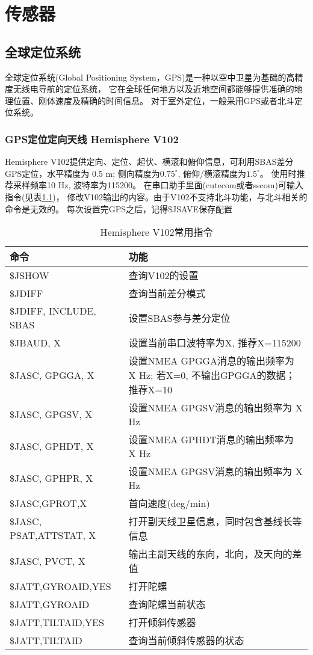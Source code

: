 \chapter{传感器}
\label{chap:sensor}
\section{全球定位系统}
全球定位系统(Global Positioning System，GPS)是一种以空中卫星为基础的高精度无线电导航的定位系统，
它在全球任何地方以及近地空间都能够提供准确的地理位置、刚体速度及精确的时间信息。
对于室外定位，一般采用GPS或者北斗定位系统。


\subsection{GPS定位定向天线 Hemisphere V102}
Hemisphere V102提供定向、定位、起伏、横滚和俯仰信息，可利用SBAS差分GPS定位，水平精度为
0.5 m; 侧向精度为$0.75^{\circ}$, 俯仰/横滚精度为$1.5^{\circ}$。
使用时推荐采样频率10 Hz, 波特率为115200。
在串口助手里面(cutecom或者sscom)可输入指令(见表\ref{tab:V102command})，
修改V102输出的内容。由于V102不支持北斗功能，与北斗相关的命令是无效的。
每次设置完GPS之后，记得\$JSAVE保存配置


\begin{table}[htbp]
  \centering
  \caption{Hemisphere V102常用指令}
    \begin{tabular}{p{11.54em}p{19.96em}}
    \toprule
    命令    & 功能 \\
    \midrule
    \$JSHOW & 查询V102的设置 \\
    \$JDIFF & 查询当前差分模式 \\
    \$JDIFF, INCLUDE, SBAS & 设置SBAS参与差分定位 \\
    \$JBAUD, X & 设置当前串口波特率为X, 推荐X=115200 \\
    \$JASC, GPGGA, X & 设置NMEA GPGGA消息的输出频率为 X Hz; 若X=0, 不输出GPGGA的数据；推荐X=10 \\
    \$JASC, GPGSV, X & 设置NMEA GPGSV消息的输出频率为 X Hz \\
    \$JASC, GPHDT, X & 设置NMEA GPHDT消息的输出频率为 X Hz \\
    \$JASC, GPHPR, X & 设置NMEA GPGSV消息的输出频率为 X Hz \\
    \$JASC,GPROT,X & 首向速度(deg/min) \\
    \$JASC, PSAT,ATTSTAT, X & 打开副天线卫星信息，同时包含基线长等信息 \\
    \$JASC, PVCT, X & 输出主副天线的东向，北向，及天向的差值 \\
    \$JATT,GYROAID,YES & 打开陀螺 \\
    \$JATT,GYROAID & 查询陀螺当前状态 \\
    \$JATT,TILTAID,YES & 打开倾斜传感器 \\
    \$JATT,TILTAID & 查询当前倾斜传感器的状态 \\
    \bottomrule
    \end{tabular}%
  \label{tab:V102command}%
\end{table}%

